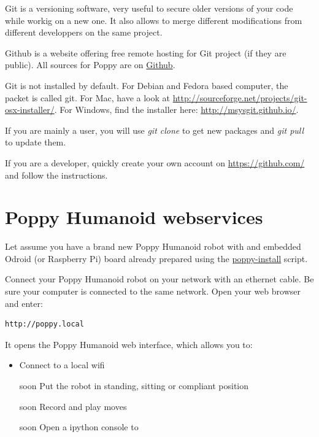 \documentclass{article}
\begin{document}
Git is a versioning software, very useful to secure older versions of your code while workig on a new one. It also allows to merge different modifications from different developpers on the same project.

Github is a website offering free remote hosting for Git project (if they are public). All sources for Poppy are on \href{https://github.com/poppy-project}{Github}.

Git is not installed by default. For Debian and Fedora based computer, the packet is called git. For Mac, have a look at \url{http://sourceforge.net/projects/git-osx-installer/}. For Windows, find the installer here: \url{http://msysgit.github.io/}.

If you are mainly a user, you will use \textit{git clone} to get new packages and \textit{git pull} to update them.

If you are a developer, quickly create your own account on \url{https://github.com/} and follow the instructions.



\section{Poppy Humanoid webservices}
\label{poppy-webservices}

Let assume you have a brand new Poppy Humanoid robot with and embedded Odroid (or Raspberry Pi) board already prepared using the \href{https://github.com/poppy-project/poppy_install}{poppy-install} script.

Connect your Poppy Humanoid robot on your network with an ethernet cable. Be sure your computer is connected to the same network. Open your web browser and enter:

\begin{verbatim}
http://poppy.local
\end{verbatim}

It opens the Poppy Humanoid web interface, which allows you to:

\begin{itemize}
\item Connect to a local wifi
\item [soon] Put the robot in standing, sitting or compliant position
\item [soon] Record and play moves
\item [soon] Open a ipython console to 
\end{itemize}
\end{document}
